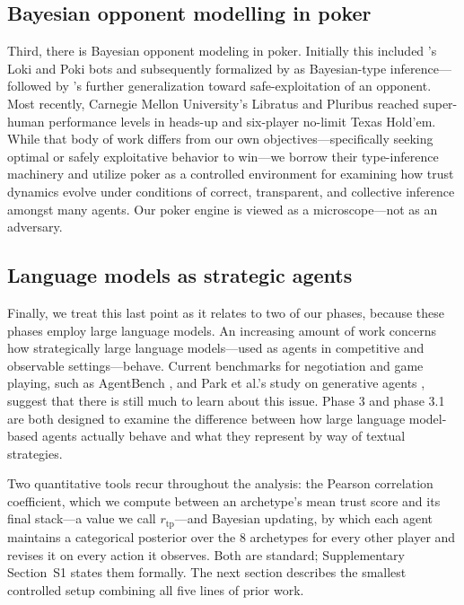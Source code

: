 \documentclass[journal]{IEEEtran}
\newcommand{\rtp}{\ensuremath{r_{\mathrm{tp}}}}
\begin{document}
\subsection{Bayesian opponent modelling in poker}
Third, there is Bayesian opponent modeling in poker. Initially
this included \citeauthor{billings1998opponent}'s Loki and Poki bots
\citep{billings1998opponent} and subsequently formalized by
\citet{southey2005bayes} as Bayesian-type inference---
followed by \citeauthor{ganzfried2015safe}'s \citep{ganzfried2015safe}
further generalization toward safe-exploitation of an opponent. Most
recently, Carnegie Mellon University's Libratus and Pluribus
\citep{brown2018superhuman,brown2019superhuman} reached super-human
performance levels in heads-up and six-player no-limit Texas
Hold'em. While that body of work differs from our own
objectives---specifically seeking optimal or safely exploitative
behavior to win---we borrow their type-inference machinery and
utilize poker as a controlled environment for examining how trust
dynamics evolve under conditions of correct, transparent, and
collective inference amongst many agents. Our poker engine is viewed
as a microscope---not as an adversary.

\subsection{Language models as strategic agents}
Finally, we treat this last point as it relates to two of our phases,
because these phases employ large language models. An increasing
amount of work concerns how strategically large language
models---used as agents in competitive and observable
settings---behave. Current benchmarks for negotiation and game
playing, such as AgentBench \citep{liu2024agentbench}, and Park et
al.'s study on generative agents \citep{park2023generative}, suggest
that there is still much to learn about this issue. Phase 3 and
phase 3.1 are both designed to examine the difference between how
large language model-based agents actually behave and what they
represent by way of textual strategies.

Two quantitative tools recur throughout the analysis: the Pearson
correlation coefficient, which we compute between an archetype's mean
trust score and its final stack---a value we call \rtp---and Bayesian
updating, by which each agent maintains a categorical posterior over
the 8 archetypes for every other player and revises it on every action
it observes. Both are standard; Supplementary Section~S1 states them
formally. The next section describes the smallest controlled setup
combining all five lines of prior work.
\end{document}
